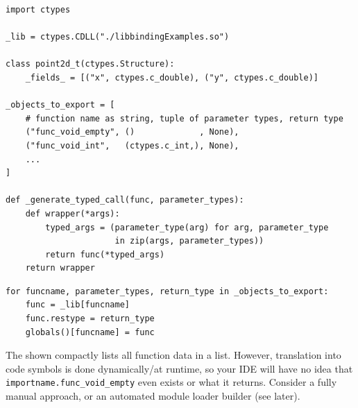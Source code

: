 
\begin{frame}[fragile]
%
\begin{codebox}
\begin{verbatim}
import ctypes

_lib = ctypes.CDLL("./libbindingExamples.so")

class point2d_t(ctypes.Structure):
    _fields_ = [("x", ctypes.c_double), ("y", ctypes.c_double)]

_objects_to_export = [
    # function name as string, tuple of parameter types, return type
    ("func_void_empty", ()             , None),
    ("func_void_int",   (ctypes.c_int,), None),
    ...
]

def _generate_typed_call(func, parameter_types):
    def wrapper(*args):
        typed_args = (parameter_type(arg) for arg, parameter_type 
                      in zip(args, parameter_types))
        return func(*typed_args)
    return wrapper
\end{verbatim}
\end{codebox}
%
\end{frame}


\begin{frame}[fragile]
%
\begin{codebox}[... Continued]
\begin{verbatim}
for funcname, parameter_types, return_type in _objects_to_export:
    func = _lib[funcname]
    func.restype = return_type
    globals()[funcname] = func
\end{verbatim}
\end{codebox}
%
\begin{warnbox}
The shown compactly lists all function data in a list. However, translation into code symbols is done dynamically/at runtime, so your IDE will have no idea that \texttt{importname.func\_void\_empty} even exists or what it returns. Consider a fully manual approach, or an automated module loader builder (see later).
\end{warnbox}
%
\end{frame}

